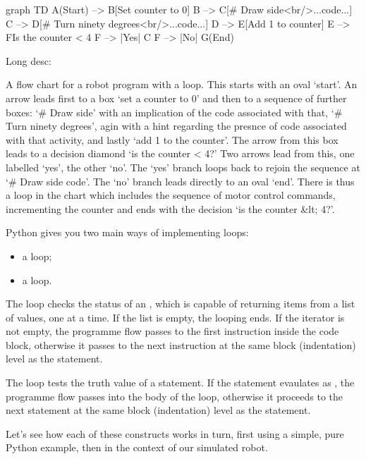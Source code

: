 \documentclass[letterpaper,10pt,english]{sphinxmanual}
\begin{document}
{graph TD
    A(Start) --> B[Set counter to 0]
    B --> C[# Draw side<br/>...code...]
    C --> D[# Turn ninety degrees<br/>...code...]
    D --> E[Add 1 to counter]
    E --> F{Is the counter < 4}
    F --> |Yes| C
    F --> |No| G(End)

Long desc:

A flow chart for a robot program with a loop. This starts with an oval ‘start’. An arrow leads first to a box ‘set a counter to 0’ and then to a sequence of further boxes: ‘# Draw side’ with an implication of the code associated with that, ‘# Turn ninety degrees’, agin with a hint regarding the presnce of code associated with that activity, and lastly ‘add 1 to the counter’. The arrow from this box leads to a decision diamond ‘is the counter < 4?’ Two arrows lead from this, one labelled ‘yes’, the other ‘no’. The ‘yes’ branch loops back to rejoin the sequence at ‘# Draw side code’. The ‘no’ branch leads directly to an oval ‘end’. There is thus a loop in the chart which includes the sequence of motor control commands, incrementing the counter and ends with the decision ‘is the counter &lt; 4?’.

Python gives you two main ways of implementing loops:
\begin{itemize}
\item {} 
a  loop;

\item {} 
a  loop.

\end{itemize}

The  loop checks the status of an , which is capable of returning items from a list of values, one at a time. If the list is empty, the looping ends. If the iterator is not empty, the programme flow passes to the first instruction inside the  code block, otherwise it passes to the next instruction at the same block (indentation) level as the  statement.

The  loop tests the truth value of a statement. If the statement evaulates as , the programme flow passes into the body of the loop, otherwise it proceeds to the next statement at the same block (indentation) level as the  statement.

Let’s see how each of these constructs works in turn, first using a simple, pure Python example, then in the context of our simulated robot.


}
\end{document}
